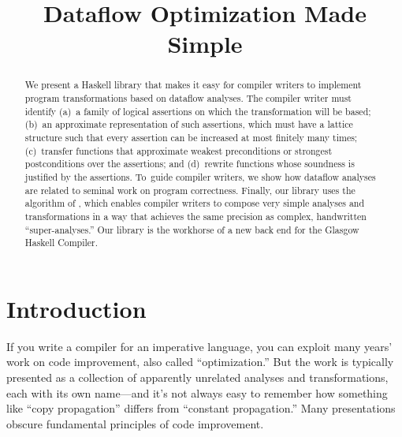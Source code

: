 \documentclass[blockstyle,preprint,natbib,nocopyrightspace]{sigplanconf}
\newcommand{\authornote}[1]{{\em #1}}
\def\authornote#1{\unskip\relax}
\newcommand{\simon}[1]{\authornote{SLPJ: #1}}
\begin{document}
\title{Dataflow Optimization Made Simple}



\maketitle
 
\begin{abstract}
We present a Haskell library that makes it easy for compiler writers
to implement program transformations based on dataflow analyses.
The compiler writer must identify (a)~a family of logical assertions
on which the transformation will be based;
(b)~an {approximate}
representation of such assertions, which
must have a lattice structure such that every assertion can be increased at
most finitely many times;
(c)~transfer functions that approximate weakest preconditions or
strongest postconditions over the assertions; and
(d)~rewrite functions whose soundness is justified by the assertions.
To~guide compiler writers,
we show how dataflow analyses are related to
seminal work on program 
correctness. \simon{The ``next 700'' section sort of does so, but I'm not 
sure it deserves mention in the abstract.}
Finally, our library uses the algorithm of 
\citet{lerner-grove-chambers:2002}, which enables compiler writers to
compose very simple analyses and transformations in a way that achieves
the same precision as complex, handwritten
``super-analyses.''
Our library is the workhorse of a new
back end for the Glasgow Haskell Compiler.
\end{abstract}

\makeatactive   %

\section{Introduction}

\ifpagetuning\enlargethispage{\baselineskip}\fi

If you write a compiler for an imperative language, you can exploit
many years' work on code improvement, also called
``optimization.''
But the work is typically presented
as a collection of apparently unrelated analyses and
transformations, each with its own name---and 
it's not always easy to %
remember how something like
``copy propagation'' differs from ``constant propagation.''
Many presentations obscure fundamental principles of
code improvement.
\end{document}
